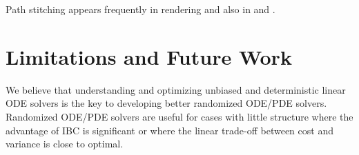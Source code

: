\documentclass[a4paper,12pt]{article}
\begin{document}
\begin{related}
  Path stitching appears frequently in rendering and also in \cite{das_sarma_fast_2015}
  and \cite{ji_reusing_2012}.
\end{related}






\section{Limitations and Future Work}

We believe that understanding and optimizing unbiased and deterministic linear ODE solvers
is the key to developing better randomized ODE/PDE solvers.
Randomized ODE/PDE solvers are useful for cases with little structure
where the advantage of IBC is significant or where the linear trade-off
between cost and variance is close to optimal. \\
\end{document}
